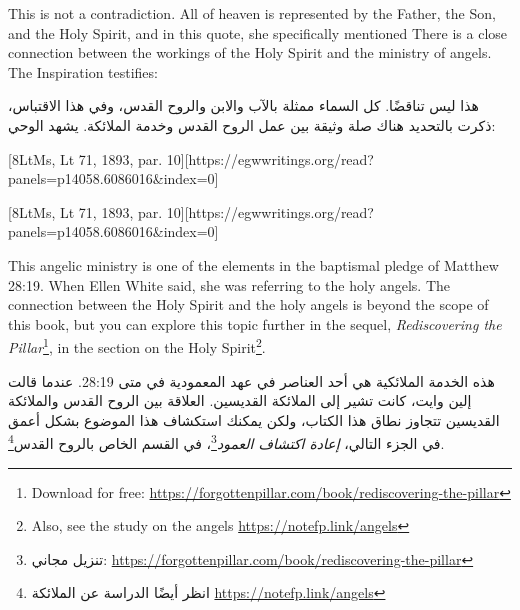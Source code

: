 This is not a contradiction. All of heaven is represented by the Father, the Son, and the Holy Spirit, and in this quote, she specifically mentioned  There is a close connection between the workings of the Holy Spirit and the ministry of angels. The Inspiration testifies:


هذا ليس تناقضًا. كل السماء ممثلة بالآب والابن والروح القدس، وفي هذا الاقتباس، ذكرت بالتحديد  هناك صلة وثيقة بين عمل الروح القدس وخدمة الملائكة. يشهد الوحي:


[8LtMs, Lt 71, 1893, par. 10][https://egwwritings.org/read?panels=p14058.6086016&index=0]


[8LtMs, Lt 71, 1893, par. 10][https://egwwritings.org/read?panels=p14058.6086016&index=0]


This angelic ministry is one of the elements in the baptismal pledge of Matthew 28:19. When Ellen White said,  she was referring to the holy angels. The connection between the Holy Spirit and the holy angels is beyond the scope of this book, but you can explore this topic further in the sequel, \textit{Rediscovering the Pillar}\footnote{Download for free: \href{https://forgottenpillar.com/book/rediscovering-the-pillar}{https://forgottenpillar.com/book/rediscovering-the-pillar}}, in the section on the Holy Spirit\footnote{Also, see the study on the angels \href{https://notefp.link/angels}{https://notefp.link/angels}}.


هذه الخدمة الملائكية هي أحد العناصر في عهد المعمودية في متى 28:19. عندما قالت إلين وايت،  كانت تشير إلى الملائكة القديسين. العلاقة بين الروح القدس والملائكة القديسين تتجاوز نطاق هذا الكتاب، ولكن يمكنك استكشاف هذا الموضوع بشكل أعمق في الجزء التالي، \textit{إعادة اكتشاف العمود}\footnote{تنزيل مجاني: \href{https://forgottenpillar.com/book/rediscovering-the-pillar}{https://forgottenpillar.com/book/rediscovering-the-pillar}}، في القسم الخاص بالروح القدس\footnote{انظر أيضًا الدراسة عن الملائكة \href{https://notefp.link/angels}{https://notefp.link/angels}}.


